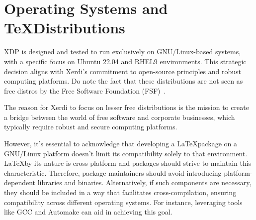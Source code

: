 \documentclass{xdpdoc}
\begin{document}
\begin{multicols}{2}
        \label{fig:updates}%

        \section{Operating Systems and \TeX Distributions}
        XDP is designed and tested to run exclusively on GNU/Linux-based systems, with a specific focus on Ubuntu 22.04 and RHEL9 environments.
        This strategic decision aligns with Xerdi's commitment to open-source principles and robust computing platforms.
        Do note the fact that these distributions are not seen as free distros by the Free Software Foundation
        (FSF)~\cite{free-distros}.

        The reason for Xerdi to focus on lesser free distributions is the mission
        to create a bridge between the world of free software and corporate businesses,
        which typically require robust and secure computing platforms.

        However,
        it's essential to acknowledge
        that developing a \LaTeX package on a GNU/Linux platform doesn't limit its compatibility solely to that environment.
        \LaTeX by its nature is cross-platform and packages should strive to maintain this characteristic.
        Therefore, package maintainers should avoid introducing platform-dependent libraries and binaries.
        Alternatively, if such components are necessary, they should be included in a way that facilitates cross-compilation,
        ensuring compatibility across different operating systems.
        For instance, leveraging tools like GCC and Automake can aid in achieving this goal.



\end{multicols}
\end{document}
